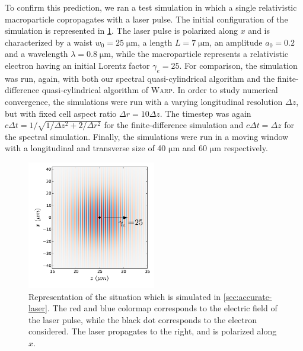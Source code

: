 \documentclass[1p,times,authoryear]{elsarticle}
\begin{document}
To confirm this prediction, we ran a test simulation in which a single
relativistic macroparticle copropagates with a laser pulse. The initial configuration of
the simulation is represented in \cref{fig:Schematic_laser}. The laser
pulse is polarized along $x$ and is characterized by a waist $w_0 = 25\;\mathrm{\mu m}$,
a length $L=7\;\mathrm{\mu m}$, an amplitude $a_0 = 0.2$ and a
wavelength $\lambda = 0.8\;\mathrm{\mu m}$, while the macroparticle
represents a relativistic electron having an initial Lorentz factor
$\gamma_e = 25$. For comparison, the simulation was run, again, with both our spectral
quasi-cylindrical algorithm and the finite-difference
quasi-cylindrical algorithm of \textsc{Warp}. In order to study
numerical convergence, the simulations were run with a varying
longitudinal resolution $\Delta z$, but with fixed cell aspect ratio
$\Delta r = 10\Delta z$. The timestep was again $c\Delta t=
1/\sqrt{1/\Delta z^2 + 2/\Delta r^2}$ for the finite-difference
simulation and $c\Delta t = \Delta z$ for the spectral
simulation. Finally, the simulations were run in a moving window with a
longitudinal and transverse size of 40 $\mathrm{\mu m}$ and 60 
$\mathrm{\mu m}$ respectively.

\begin{figure}[!h]
\centering
\includegraphics[width=0.5\textwidth]{figures/Schematic_laser.pdf}
\caption{\label{fig:Schematic_laser}Representation of the situation
  which is simulated in \cref{sec:accurate-laser}. The red and blue
  colormap corresponds to the electric field of the laser pulse, while
  the black dot corresponds to the electron considered. 
The laser propagates to the right, and is polarized along $x$.}
\end{figure}
\end{document}
